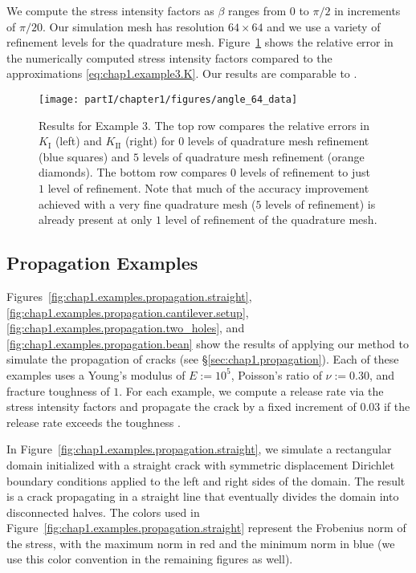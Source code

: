 We compute the stress intensity factors as $\beta$ ranges from $0$ to $\pi/2$ in increments of $\pi/20$. Our simulation mesh has resolution $64 \times 64$ and we use a variety of refinement levels for the quadrature mesh. Figure~\ref{fig:chap1.example3.results} shows the relative error in the numerically computed stress intensity factors compared to the approximations \eqref{eq:chap1.example3.K}. Our results are comparable to \cite{Moes99}.

\setlength{\figurewidth}{\textwidth}
\begin{figure}[htbp]
\centering
\texttt{[image: partI/chapter1/figures/angle\_64\_data]}
\caption{Results for Example 3. The top row compares the relative errors in $K_{\text{I}}$ (left) and $K_{\text{II}}$ (right) for $0$ levels of quadrature mesh refinement (blue squares) and $5$ levels of quadrature mesh refinement (orange diamonds). The bottom row compares $0$ levels of refinement to just $1$ level of refinement. Note that much of the accuracy improvement achieved with a very fine quadrature mesh ($5$ levels of refinement) is already present at only $1$ level of refinement of the quadrature mesh.}
\label{fig:chap1.example3.results}
\end{figure}

\subsection{Propagation Examples}

Figures~\ref{fig:chap1.examples.propagation.straight}, \ref{fig:chap1.examples.propagation.cantilever.setup}, \ref{fig:chap1.examples.propagation.two_holes}, and \ref{fig:chap1.examples.propagation.bean} show the results of applying our method to simulate the propagation of cracks (see \S\ref{sec:chap1.propagation}). Each of these examples uses a Young's modulus of $E := 10^5$, Poisson's ratio of $\nu := 0.30$, and fracture toughness of $1$. For each example, we compute a release rate via the stress intensity factors and propagate the crack by a fixed increment of $0.03$ if the release rate exceeds the toughness \cite{Anderson05}.

In Figure~\ref{fig:chap1.examples.propagation.straight}, we simulate a rectangular domain initialized with a straight crack with symmetric displacement Dirichlet boundary conditions applied to the left and right sides of the domain. The result is a crack propagating in a straight line that eventually divides the domain into disconnected halves. The colors used in Figure~\ref{fig:chap1.examples.propagation.straight} represent the Frobenius norm of the stress, with the maximum norm in red and the minimum norm in blue (we use this color convention in the remaining figures as well).

